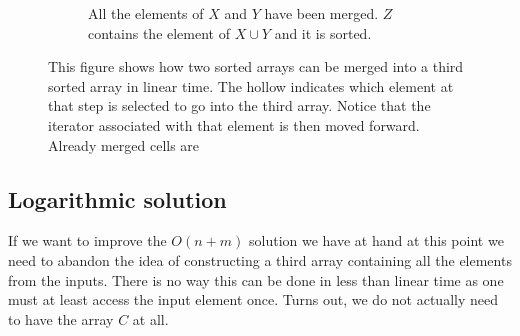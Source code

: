 \begin{figure}
\begin{subfigure}[b]{0.45\textwidth}
		\caption{All the elements of $X$ and $Y$ have been merged. $Z$ contains the element of $X \cup Y$ and it is sorted.}
		\label{fig:median_sorted_array:mergearray8}
	\end{subfigure}
	\caption[Example of merging two sorted arrays.]{This figure shows how two sorted arrays can be merged into a third sorted array in linear time. The hollow indicates which element at that step is selected to go into the third array. Notice that the iterator associated with that element is then moved forward. Already merged cells are }
	\label{fig:median_sorted_array:mergearray}
\end{figure}


\subsection{Logarithmic solution}
\label{median_sorted_arrays:sec:log}
If we want to improve the $O(n+m)$ solution we have at hand at this point we need to abandon the idea of constructing a third array containing all the elements from the inputs.
There is no way this can be done in less than linear time as one must at least access the input element once.
Turns out, we do not actually need to have the array $C$ at all. 

